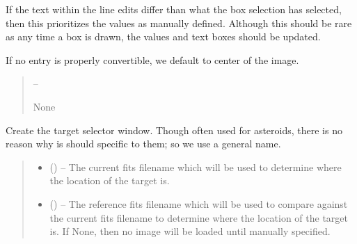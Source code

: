 \documentclass[letterpaper,11pt,english]{sphinxmanual}
\begin{document}
\begin{savenotes}
\begin{fulllineitems}
\begin{savenotes}
\begin{fulllineitems}
\sphinxAtStartPar
If the text within the line edits differ than what the box selection
has selected, then this prioritizes the values as manually defined.
Although this should be rare as any time a box is drawn, the values
and text boxes should be updated.

\sphinxAtStartPar
If no entry is properly convertible, we default to center of the image.
\begin{quote}\begin{description}
\sphinxAtStartPar
{} – 

\sphinxAtStartPar
None

\end{description}\end{quote}

\end{fulllineitems}\end{savenotes}


\begin{savenotes}\begin{fulllineitems}
\label{\detokenize{code/opihiexarata.gui.selector:opihiexarata.gui.selector.TargetSelectorWindow.__init__}}
\pysigstartsignatures
{}
\pysigstopsignatures
\sphinxAtStartPar
Create the target selector window. Though often used for asteroids,
there is no reason why is should specific to them; so we use a general
name.
\begin{quote}\begin{description}
\begin{itemize}
\item {} 
\sphinxAtStartPar
{} () – The current fits filename which will be used to determine where the
location of the target is.

\item {} 
\sphinxAtStartPar
{} (\sphinxstyleliteralemphasis{\sphinxupquote{, }}) – The reference fits filename which will be used to compare against the
current fits filename to determine where the location of the target
is. If None, then no image will be loaded until manually specified.


\end{itemize}
\end{description}
\end{quote}
\end{fulllineitems}
\end{savenotes}
\end{fulllineitems}
\end{savenotes}
\end{document}
